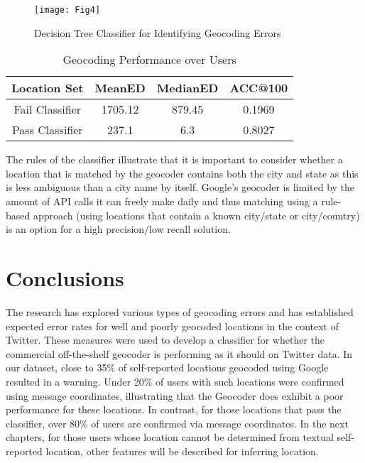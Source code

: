 \begin{figure}[!t]
\centering
\texttt{[image: Fig4]}
\caption{Decision Tree Classifier for Identifying Geocoding Errors}
\label{fig_ch2_4}
\end{figure}

\begin{table}
\small
\renewcommand{\arraystretch}{1.2}
\caption{Geocoding Performance over Users}
\label{table_ch2_7}
\centering
\begin{tabular}{|c|c|c|c|}
\hline
\bfseries Location Set & \bfseries MeanED & \bfseries MedianED & \bfseries ACC@100\\
\hline
Fail Classifier&1705.12&879.45&0.1969\\
\hline
Pass Classifier&237.1&6.3&0.8027\\
\hline
\end{tabular}
\end{table}

The rules of the classifier illustrate that it is important to consider whether a location that is matched by the geocoder contains both the city and state as this is less ambiguous than a city name by itself. Google's geocoder is limited by the amount of API calls it can freely make daily and thus matching using a rule-based approach (using locations that contain a known city/state or city/country) is an option for a high precision/low recall solution.

\section{Conclusions}
The research has explored various types of geocoding errors and has established expected error rates for well and poorly geocoded locations in the context of Twitter. These measures were used to develop a classifier for whether the commercial off-the-shelf geocoder is performing as it should on Twitter data. In our dataset, close to 35\% of self-reported locations geocoded using Google resulted in a warning. Under 20\% of users with such locations were confirmed using message coordinates, illustrating that the Geocoder does exhibit a poor performance for these locations. In contrast, for those locations that pass the classifier, over 80\% of users are confirmed via message coordinates. In the next chapters, for those users whose location cannot be determined from textual self-reported location, other features will be described for inferring location.